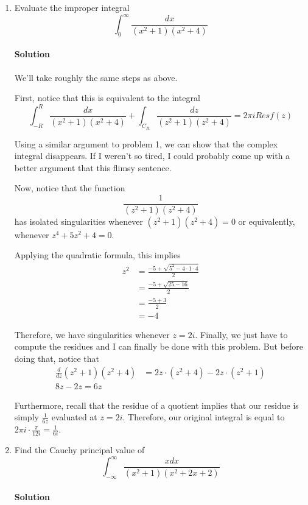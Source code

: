 \documentclass[11pt]{article}
\begin{document}
\begin{enumerate}
	\item Evaluate the improper integral \[\int_0^\infty \frac{dx}{(x^2 + 1)(x^2 + 4)} \]
	
	\paragraph{Solution} We'll take roughly the same steps as above.
	
	
	 First, notice that this is equivalent to the integral 
	 \[
	 \int^R_{-R} \frac{dx}{(x^2 + 1)(x^2 + 4)} +
	 \int_{C_R} \frac{dz}{(z^2 + 1)(z^2 + 4)} = 2\pi i Res f(z)
	 \]
	
	Using a similar argument to problem 1, we can show that the complex integral disappears. If I weren't so tired, I could probably come up with a better argument that this flimsy sentence.
	
	\bigskip Now, notice that the function
	\[\frac{1}{(z^2 + 1)(z^2 + 4)}\] has isolated singularities whenever
	 $(z^2 + 1)(z^2 + 4) = 0$ or equivalently, whenever $z^4 + 5z^2 + 4 = 0$.
	 
	Applying the quadratic formula, this implies
	\[\begin{aligned}
	z^2
	&= \frac{-5 + \sqrt{5^2 - 4\cdot 1 \cdot 4}}{2} \\
	&= \frac{-5 + \sqrt{25 - 16}}{2} \\
	&= \frac{-5 + 3}{2} \\
	&= -4
	\end{aligned}\]
	
	Therefore, we have singularities whenever $z = 2i$. Finally, we just have to compute the residues and I can finally be done with this problem. But before doing that, notice that
	\[\begin{aligned}
	\frac{d}{dz} (z^2 + 1)(z^2 + 4) &=
	2z \cdot (z^2 + 4) - 2z \cdot (z^2 + 1) \\
	8z - 2z = 6z
	\end{aligned} \]
	
	Furthermore, recall that the residue of a quotient implies that our residue is simply
    $\frac{1}{6z}$ evaluated at $z = 2i$. Therefore, our original integral is equal to $2\pi i \cdot \frac{\pi}{12i} = \frac{1}{6i}$.
	
	\item Find the Cauchy principal value of
	\[\int_{-\infty}^{\infty} \frac{x dx}{(x^2 + 1)(x^2 + 2x + 2)} \]
	
	\paragraph{Solution}
	

\end{enumerate}
\end{document}
